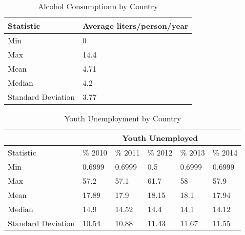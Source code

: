 \documentclass{article}
\begin{document}
\begin{table}[ht]
\centering
\begin{tabular}{|l|l|}
\hline
Statistic          & Average liters/person/year \\ \hline
Min                & 0                          \\ \hline
Max                & 14.4                       \\ \hline
Mean               & 4.71                       \\ \hline
Median             & 4.2                        \\ \hline
Standard Deviation & 3.77                       \\ \hline
\end{tabular}
\caption{Alcohol Consumptionn by Country}
\label{summary-statistic-table-alcohol}
\end{table}

\begin{table}[ht]
\centering
\begin{tabular}{|l|l|l|l|l|l|}
\hline
          &  \multicolumn{5}{c|}{Youth Unemployed} \\ \hline
Statistic          &  \%  2010 &  \% 2011 &  \% 2012 &  \%  2013 & \% 2014 \\ \hline
Min                & 0.6999                    & 0.6999                    & 0.5                       & 0.6999                    & 0.6999                    \\ \hline
Max                & 57.2                      & 57.1                      & 61.7                      & 58                        & 57.9                      \\ \hline
Mean               & 17.89                     & 17.9                      & 18.15                     & 18.1                      & 17.94                     \\ \hline
Median             & 14.9                      & 14.52                     & 14.4                      & 14.1                      & 14.12                     \\ \hline
Standard Deviation & 10.54                     & 10.88                     & 11.43                     & 11.67                     & 11.55                     \\ \hline
\end{tabular}
\caption{Youth Unemployment by Country}
\label{summary-statistic-table-youth-unemployment}
\end{table}
\end{document}
